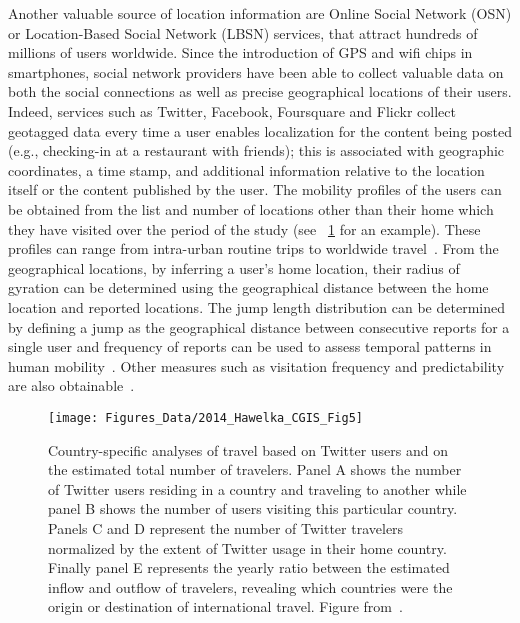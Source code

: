 Another valuable source of location information are Online Social Network (OSN) or Location-Based Social Network (LBSN) services, that attract hundreds of millions of users worldwide. Since the introduction of GPS and wifi chips in smartphones, social network providers have been able to collect valuable data on both the social connections as well as precise geographical locations of their users.
Indeed, services such as Twitter, Facebook, Foursquare and Flickr collect geotagged data every time a user enables localization for the content being posted (e.g., checking-in at a restaurant with friends); this is associated with geographic coordinates, a time stamp, and additional information relative to the location itself or the content published by the user.
The mobility profiles of the users can be obtained from the list and number of locations other than their home which they have visited over the period of the study (see \figurename~\ref{fig:2014_Hawelka_CGIS_Fig5} for an example). These profiles can range from intra-urban routine trips to worldwide travel~\cite{noulas_2012_tale, hawelka_2014_geo}. 
From the geographical locations, by inferring a user's home location, their radius of gyration can be determined using the geographical distance between the home location and reported locations.
The jump length distribution can be determined by defining a jump as the geographical distance between consecutive reports for a single user and frequency of reports can be used to assess temporal patterns in human mobility~\cite{hawelka_2014_geo}. Other measures such as visitation frequency and predictability are also obtainable~\cite{jurdak_2015_understanding}. \\

\begin{figure}[t!]
\centering
\texttt{[image: Figures\_Data/2014\_Hawelka\_CGIS\_Fig5]}
\caption{Country-specific analyses of travel based on Twitter users and on the estimated total number of travelers. Panel A shows the number of Twitter users residing in a country and traveling to another while panel B shows the number of users visiting this particular country. Panels C and D represent the number of Twitter travelers normalized by the  extent of Twitter usage in their home country. Finally  panel E represents the yearly ratio between the estimated inflow and outflow of travelers, revealing which countries were the origin or destination of international travel. Figure from~\cite{hawelka_2014_geo}.}
\label{fig:2014_Hawelka_CGIS_Fig5}
\end{figure}

